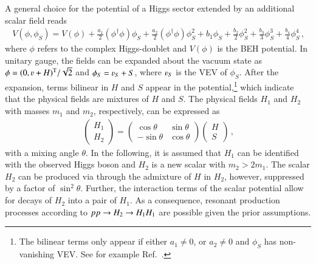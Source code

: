 \begin{description}
  A general choice for the potential of a Higgs sector extended by an additional
  scalar field
  reads~\cite{OConnell:2006rsp,No:2013wsa,Chen:2014ask,DiMicco:2019ngk}
  \begin{align*}
    V(\phi, \phi_{S}) = V(\phi)
    + \frac{a_1}{2} (\phi^\dagger \phi) \phi_{S}
    + \frac{a_2}{2} (\phi^\dagger \phi) \phi_{S}^2
    + b_1 \phi_{S} + \frac{b_2}{2} \phi_{S}^2 + \frac{b_3}{3} \phi_{S}^3 + \frac{b_4}{4} \phi_{S}^4 \,\text{,}
  \end{align*}
  where $\phi$ refers to the complex Higgs-doublet and $V(\phi)$ is the BEH
  potential. In unitary gauge, the fields can be expanded about the vacuum state
  as $\phi = (0, \varv + H)^{\text{T}} / \sqrt{2}$ and $\phi_{S} = \varv_{S} + S$, where
  $\varv_{S}$ is the VEV of $\phi_{S}$. After the expansion, terms bilinear in $H$
  and $S$ appear in the potential,\footnote{The bilinear terms only appear if
    either $a_1 \neq 0$, or $a_2 \neq 0$ and $\phi_{S}$ has non-vanishing
    VEV. See for example Ref.~\cite{Chen:2014ask}.} which indicate that the
  physical fields are mixtures of $H$ and $S$. The physical fields $H_1$ and
  $H_2$ with masses $m_1$ and $m_2$, respectively, can be expressed as
  \begin{align*}
    \begin{pmatrix}
      H_1 \\
      H_2
    \end{pmatrix}
    =
    \begin{pmatrix}
      \cos\theta & \sin\theta \\
      -\sin\theta & \cos\theta
    \end{pmatrix}
    \begin{pmatrix}
      H \\
      S
    \end{pmatrix} \,\text{,}
  \end{align*}
  with a mixing angle $\theta$. In the following, it is assumed that $H_1$ can
  be identified with the observed Higgs boson and $H_2$ is a new scalar with
  $m_2 > 2 m_1$.  The scalar $H_2$ can be produced via \ggF through the
  admixture of $H$ in $H_2$, however, suppressed by a factor of
  $\sin^2\theta$. Further, the interaction terms of the scalar potential allow
  for decays of $H_2$ into a pair of $H_1$. As a consequence, resonant
  production processes according to $pp \to H_2 \to H_1 H_1$ are possible given
  the prior assumptions.


\end{description}
